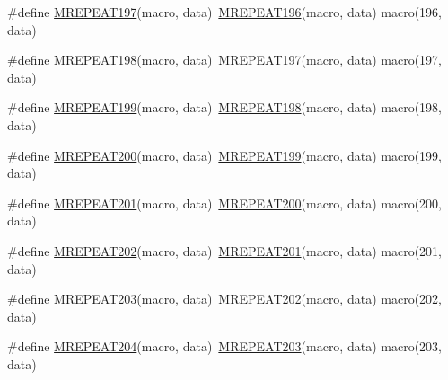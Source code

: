 \begin{DoxyCompactItemize}
\item 
\#define \mbox{\hyperlink{group__group__sam0__utils__mrepeat_ga8d5a1466ff85f6b12ce43dd9a5edf7e5}{M\+R\+E\+P\+E\+A\+T197}}(macro,  data)~\mbox{\hyperlink{group__group__sam0__utils__mrepeat_ga960fa8ced64817d70ae389a75693f351}{M\+R\+E\+P\+E\+A\+T196}}(macro, data)   macro(196, data)
\item 
\#define \mbox{\hyperlink{group__group__sam0__utils__mrepeat_ga4061c0d7ba556ac993f2bcca14dd479c}{M\+R\+E\+P\+E\+A\+T198}}(macro,  data)~\mbox{\hyperlink{group__group__sam0__utils__mrepeat_ga8d5a1466ff85f6b12ce43dd9a5edf7e5}{M\+R\+E\+P\+E\+A\+T197}}(macro, data)   macro(197, data)
\item 
\#define \mbox{\hyperlink{group__group__sam0__utils__mrepeat_gae89c87df1febe41c657bbbff536a77fa}{M\+R\+E\+P\+E\+A\+T199}}(macro,  data)~\mbox{\hyperlink{group__group__sam0__utils__mrepeat_ga4061c0d7ba556ac993f2bcca14dd479c}{M\+R\+E\+P\+E\+A\+T198}}(macro, data)   macro(198, data)
\item 
\#define \mbox{\hyperlink{group__group__sam0__utils__mrepeat_gad87de52b3036ad813d9f01fe6dc57d38}{M\+R\+E\+P\+E\+A\+T200}}(macro,  data)~\mbox{\hyperlink{group__group__sam0__utils__mrepeat_gae89c87df1febe41c657bbbff536a77fa}{M\+R\+E\+P\+E\+A\+T199}}(macro, data)   macro(199, data)
\item 
\#define \mbox{\hyperlink{group__group__sam0__utils__mrepeat_gae15bf8ac240e5b8bb7d7fc73c7b58e41}{M\+R\+E\+P\+E\+A\+T201}}(macro,  data)~\mbox{\hyperlink{group__group__sam0__utils__mrepeat_gad87de52b3036ad813d9f01fe6dc57d38}{M\+R\+E\+P\+E\+A\+T200}}(macro, data)   macro(200, data)
\item 
\#define \mbox{\hyperlink{group__group__sam0__utils__mrepeat_ga5a2a3af10439763667d2adee22e01fff}{M\+R\+E\+P\+E\+A\+T202}}(macro,  data)~\mbox{\hyperlink{group__group__sam0__utils__mrepeat_gae15bf8ac240e5b8bb7d7fc73c7b58e41}{M\+R\+E\+P\+E\+A\+T201}}(macro, data)   macro(201, data)
\item 
\#define \mbox{\hyperlink{group__group__sam0__utils__mrepeat_ga017ff6b502ad948e0419894957597258}{M\+R\+E\+P\+E\+A\+T203}}(macro,  data)~\mbox{\hyperlink{group__group__sam0__utils__mrepeat_ga5a2a3af10439763667d2adee22e01fff}{M\+R\+E\+P\+E\+A\+T202}}(macro, data)   macro(202, data)
\item 
\#define \mbox{\hyperlink{group__group__sam0__utils__mrepeat_ga0e339097dee89fd4eaf9885f32db1c16}{M\+R\+E\+P\+E\+A\+T204}}(macro,  data)~\mbox{\hyperlink{group__group__sam0__utils__mrepeat_ga017ff6b502ad948e0419894957597258}{M\+R\+E\+P\+E\+A\+T203}}(macro, data)   macro(203, data)

\end{DoxyCompactItemize}
